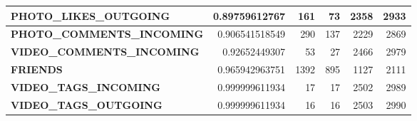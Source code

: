\begin{table}
\begin{tabular}{| >{\small}l | >{\small}r | >{\small}r | >{\small}r | >{\small}r | >{\small}r |}
	\hline
	\textbf{PHOTO\_LIKES\_OUTGOING} & 0.89759612767 & 161 & 73 & 2358 & 2933\\
	\hline
	\textbf{PHOTO\_COMMENTS\_INCOMING} & 0.906541518549 & 290 & 137 & 2229 & 2869\\
	\hline
	\textbf{VIDEO\_COMMENTS\_INCOMING} & 0.92652449307 & 53 & 27 & 2466 & 2979\\
	\hline
	\textbf{FRIENDS} & 0.965942963751 & 1392 & 895 & 1127 & 2111\\
	\hline
	\textbf{VIDEO\_TAGS\_INCOMING} & 0.999999611934 & 17 & 17 & 2502 & 2989\\
	\hline
	\textbf{VIDEO\_TAGS\_OUTGOING} & 0.999999611934 & 16 & 16 & 2503 & 2990\\
	\hline
	\end{tabular}
\end{table}

\cleardoublepage

